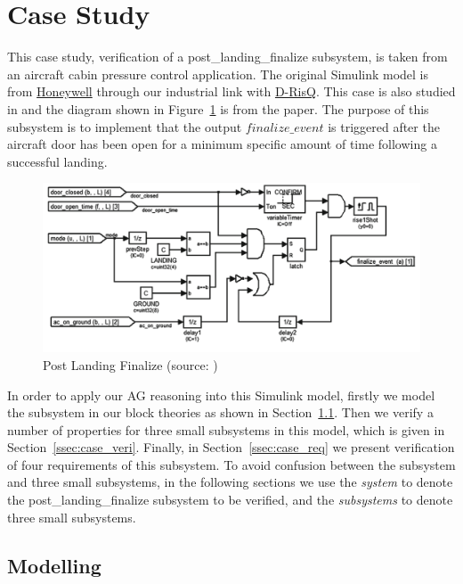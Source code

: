 \section{Case Study}
\label{sec:case}

This case study, verification of a \textsf{post\_landing\_finalize} subsystem, is taken from an aircraft cabin pressure control application. The original Simulink model is from \href{https://www.honeywell.com/}{Honeywell} through our industrial link with \href{http://www.drisq.com/}{D-RisQ}. This case is also studied in \cite{Bhatt2016} and the diagram shown in Figure~\ref{fig:case} is from the paper. The purpose of this subsystem is to implement that the output $finalize\_event$ is triggered after the aircraft door has been open for a minimum specific amount of time following a successful landing. 

\begin{figure}[htb!]
    \begin{center}
        \includegraphics[scale=0.55]{postlanding}
    \end{center}
    \caption{Post Landing Finalize (source: \cite{Bhatt2016})}
    \label{fig:case}
\end{figure}

In order to apply our AG reasoning into this Simulink model, firstly we model the subsystem in our block theories as shown in Section~\ref{ssec:case_model}. Then we verify a number of properties for three small subsystems in this model, which is given in Section~\ref{ssec:case_veri}. Finally, in Section~\ref{ssec:case_req} we present verification of four requirements of this subsystem. To avoid confusion between the subsystem and three small subsystems, in the following sections we use the \emph{system} to denote the \textsf{post\_landing\_finalize} subsystem to be verified, and the \emph{subsystems} to denote three small subsystems.

\subsection{Modelling}
\label{ssec:case_model}

